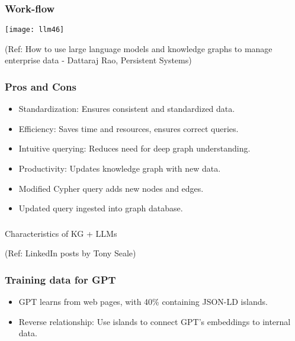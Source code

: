 \begin{frame}[fragile]\frametitle{Work-flow}

\begin{center}
\texttt{[image: llm46]}

{\tiny (Ref: How to use large language models and knowledge graphs to manage enterprise data - Dattaraj Rao, Persistent Systems)}
\end{center}
\end{frame}


\begin{frame}[fragile]\frametitle{Pros and Cons}

\begin{itemize}
\item Standardization: Ensures consistent and standardized data.
\item Efficiency: Saves time and resources, ensures correct queries.
\item Intuitive querying: Reduces need for deep graph understanding.
\item Productivity: Updates knowledge graph with new data.
\item Modified Cypher query adds new nodes and edges.
\item Updated query ingested into graph database.
\end{itemize}
\end{frame}


\begin{frame}[fragile]\frametitle{}
\begin{center}
{\Large Characteristics of KG + LLMs}

{\tiny (Ref: LinkedIn posts by Tony Seale)}
\end{center}
\end{frame}

\begin{frame}[fragile]\frametitle{Training data for GPT}

\begin{itemize}
\item GPT learns from web pages, with 40\% containing JSON-LD islands.
\item Reverse relationship: Use islands to connect GPT's embeddings to internal data.
\end{itemize}
	  
\end{frame}

